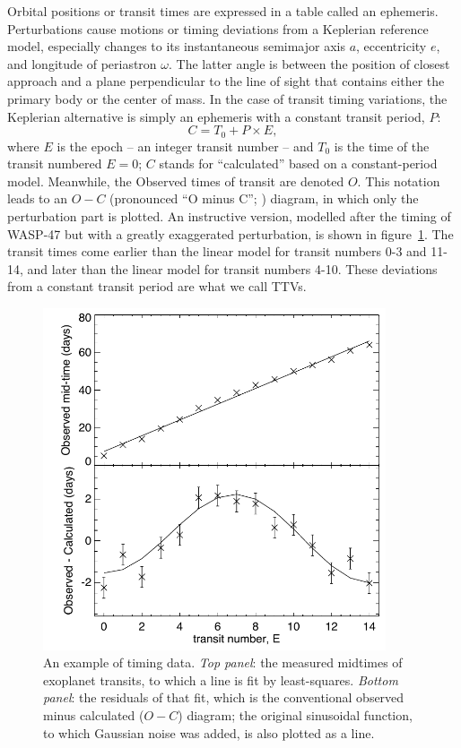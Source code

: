 \documentclass[graybox,natbib,nosecnum]{svmult}
\begin{document}
Orbital positions or transit times are expressed in a table called an ephemeris. Perturbations cause motions or timing deviations from a Keplerian reference model, especially changes to its instantaneous semimajor axis $a$, eccentricity $e$, and longitude of periastron $\omega$.  The latter angle is between the position of closest approach and a plane perpendicular to the line of sight that contains either the primary body or the center of mass.  In the case of transit timing variations, the Keplerian alternative is simply an ephemeris with a constant transit period, $P$:
\begin{equation}
C = T_0 + P \times E, 
\end{equation}
where $E$ is the epoch -- an integer transit number -- and $T_0$ is the time of the transit numbered $E=0$; $C$ stands for ``calculated'' based on a constant-period model.  Meanwhile, the Observed times of transit are denoted $O$.  This notation leads to an $O-C$ (pronounced ``O minus C''; \citealt{2005Sterken}) diagram, in which only the perturbation part is plotted.  An instructive version, modelled after the timing of WASP-47 \citep{2015Becker} but with a greatly exaggerated perturbation, is shown in figure~\ref{omc}.  The transit times come earlier than the linear model for transit numbers 0-3 and 11-14, and later than the linear model for transit numbers 4-10.  These deviations from a constant transit period are what we call TTVs.

\begin{figure}
\centerline{
\includegraphics[width=0.9\textwidth]{omc.pdf}}
%
\caption{An example of timing data.  \emph{Top panel}: the measured midtimes of exoplanet transits, to which a line is fit by least-squares.  \emph{Bottom panel}: the residuals of that fit, which is the conventional observed minus calculated ($O-C$) diagram; the original sinusoidal function, to which Gaussian noise was added, is also plotted as a line. }
\label{omc}       %
\end{figure}
\end{document}
